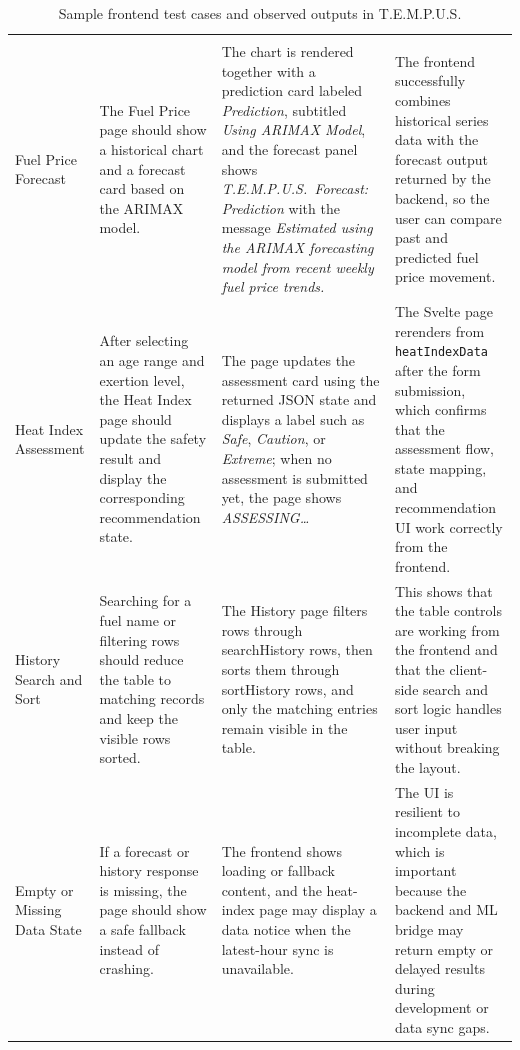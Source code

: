 \documentclass[12pt]{article}
\begin{document}
\begingroup
\small
\setlength{\tabcolsep}{5pt}
\renewcommand{\arraystretch}{1.4}
\begin{longtable}{|>{\RaggedRight\arraybackslash}p{2.0cm}|>{\RaggedRight\arraybackslash}p{3.3cm}|>{\RaggedRight\arraybackslash}p{3.8cm}|>{\RaggedRight\arraybackslash}p{3.3cm}|}
\caption{Sample frontend test cases and observed outputs in T.E.M.P.U.S.}\\
\hline
\multicolumn{1}{|c|}{\textbf{Test Case}} & \multicolumn{1}{c|}{\textbf{Expected Output}} & \multicolumn{1}{c|}{\textbf{Actual Output}} & \multicolumn{1}{c|}{\textbf{Explanation}} \\
\hline
\endfirsthead
\hline
\multicolumn{1}{|c|}{\textbf{Test Case}} & \multicolumn{1}{c|}{\textbf{Expected Output}} & \multicolumn{1}{c|}{\textbf{Actual Output}} & \multicolumn{1}{c|}{\textbf{Explanation}} \\
\hline
\endhead
\hline
\endfoot
Fuel Price Forecast
& The Fuel Price page should show a historical chart and a forecast card based on the ARIMAX model.
& The chart is rendered together with a prediction card labeled \textit{Prediction}, subtitled \textit{Using ARIMAX Model}, and the forecast panel shows \textit{T.E.M.P.U.S.\ Forecast: Prediction} with the message \textit{Estimated using the ARIMAX forecasting model from recent weekly fuel price trends.}
& The frontend successfully combines historical series data with the forecast output returned by the backend, so the user can compare past and predicted fuel price movement.
\\
\hline
Heat Index Assessment
& After selecting an age range and exertion level, the Heat Index page should update the safety result and display the corresponding recommendation state.
& The page updates the assessment card using the returned JSON state and displays a label such as \textit{Safe}, \textit{Caution}, or \textit{Extreme}; when no assessment is submitted yet, the page shows \textit{ASSESSING\ldots}
& The Svelte page rerenders from \texttt{heatIndexData} after the form submission, which confirms that the assessment flow, state mapping, and recommendation UI work correctly from the frontend.
\\
\hline
History Search and Sort
& Searching for a fuel name or filtering rows should reduce the table to matching records and keep the visible rows sorted.
& The History page filters rows through searchHistory rows, then sorts them through sortHistory rows, and only the matching entries remain visible in the table.
& This shows that the table controls are working from the frontend and that the client-side search and sort logic handles user input without breaking the layout.
\\
\hline
Empty or Missing Data State
& If a forecast or history response is missing, the page should show a safe fallback instead of crashing.
& The frontend shows loading or fallback content, and the heat-index page may display a data notice when the latest-hour sync is unavailable.
& The UI is resilient to incomplete data, which is important because the backend and ML bridge may return empty or delayed results during development or data sync gaps.
\\
\hline
\end{longtable}
\endgroup
 
\end{document}
